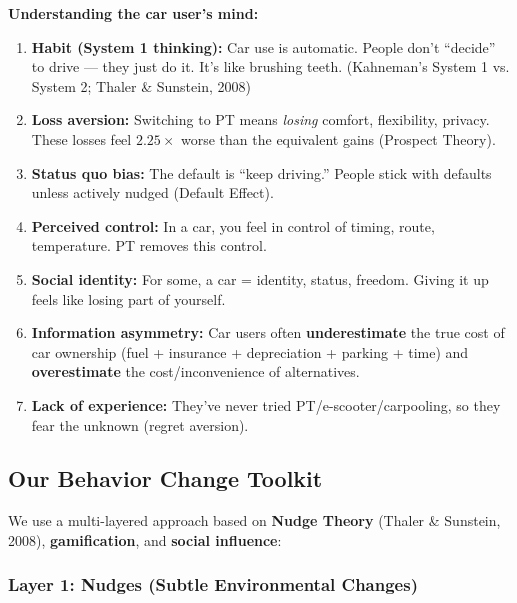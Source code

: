 \documentclass[11pt,a4paper]{article}
\begin{document}
\begin{tcolorbox}[colback=lightred,colframe=deepred,title=\textbf{Why People Resist Changing from Car}]
\textbf{Understanding the car user's mind:}
\begin{enumerate}[noitemsep]
    \item \textbf{Habit (System 1 thinking):} Car use is automatic. People don't ``decide'' to drive --- they just do it. It's like brushing teeth. (Kahneman's System 1 vs. System 2; Thaler \& Sunstein, 2008)
    \item \textbf{Loss aversion:} Switching to PT means \textit{losing} comfort, flexibility, privacy. These losses feel $2.25\times$ worse than the equivalent gains (Prospect Theory).
    \item \textbf{Status quo bias:} The default is ``keep driving.'' People stick with defaults unless actively nudged (Default Effect).
    \item \textbf{Perceived control:} In a car, you feel in control of timing, route, temperature. PT removes this control.
    \item \textbf{Social identity:} For some, a car = identity, status, freedom. Giving it up feels like losing part of yourself.
    \item \textbf{Information asymmetry:} Car users often \textbf{underestimate} the true cost of car ownership (fuel + insurance + depreciation + parking + time) and \textbf{overestimate} the cost/inconvenience of alternatives.
    \item \textbf{Lack of experience:} They've never tried PT/e-scooter/carpooling, so they fear the unknown (regret aversion).
\end{enumerate}
\end{tcolorbox}

\subsection{Our Behavior Change Toolkit}

We use a multi-layered approach based on \textbf{Nudge Theory} (Thaler \& Sunstein, 2008), \textbf{gamification}, and \textbf{social influence}:

\subsubsection{Layer 1: Nudges (Subtle Environmental Changes)}
\end{document}

